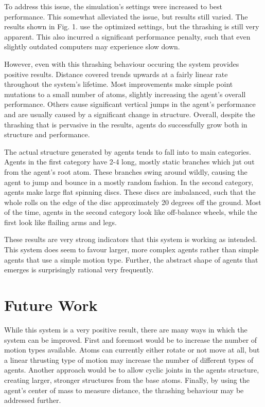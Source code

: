 \documentclass[runningheads]{llncs}
\begin{document}
To address this issue, the simulation's settings were increased to best performance.
This somewhat alleviated the issue, but results still varied.
The results shown in Fig. 1. use the optimized settings, but the thrashing is still very apparent.
This also incurred a significant performance penalty, such that even slightly outdated computers may experience slow down.

However, even with this thrashing behaviour occuring the system provides positive results.
Distance covered trends upwards at a fairly linear rate throughout the system's lifetime.
Most improvements make simple point mutations to a small number of atoms, slightly increasing the agent's overall performance.
Others cause significant vertical jumps in the agent's performance and are usually caused by a significant change in structure.
Overall, despite the thrashing that is pervasive in the results, agents do successfully grow both in structure and performance.

The actual structure generated by agents tends to fall into to main categories.
Agents in the first category have 2-4 long, mostly static branches which jut out from the agent's root atom. 
These branches swing around wildly, causing the agent to jump and bounce in a mostly random fashion.
In the second category, agents make large flat spinning discs.
These discs are imbalanced, such that the whole rolls on the edge of the disc approximately 20 degrees off the ground.
Most of the time, agents in the second category look like off-balance wheels, while the first look like flailing arms and legs.

These results are very strong indicators that this system is working as intended.
This system does seem to favour larger, more complex agents rather than simple agents that use a simple motion type.
Further, the abstract shape of agents that emerges is surprisingly rational very frequently.

\section{Future Work}
While this system is a very positive result, there are many ways in which the system can be improved.
First and foremost would be to increase the number of motion types available.
Atoms can currently either rotate or not move at all, but a linear thrusting type of motion may increase the number of different types of agents.
Another approach would be to allow cyclic joints in the agents structure, creating larger, stronger structures from the base atoms.
Finally, by using the agent's center of mass to measure distance, the thrashing behaviour may be addressed further.
\end{document}
